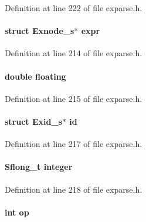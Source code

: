 Definition at line 222 of file exparse.\+h.

\hypertarget{union_e_x_s_t_y_p_e_a5147a7084c9f4929f621b9c1d88f37e4}{
\paragraph[{expr}]{\setlength{\rightskip}{0pt plus 5cm}struct Exnode\+\_\+s$\ast$ expr}}\label{union_e_x_s_t_y_p_e_a5147a7084c9f4929f621b9c1d88f37e4}


Definition at line 214 of file exparse.\+h.

\hypertarget{union_e_x_s_t_y_p_e_a347120387fb1d297ddcdf38a1fe7578f}{
\paragraph[{floating}]{\setlength{\rightskip}{0pt plus 5cm}double floating}}\label{union_e_x_s_t_y_p_e_a347120387fb1d297ddcdf38a1fe7578f}


Definition at line 215 of file exparse.\+h.

\hypertarget{union_e_x_s_t_y_p_e_a8cbcc48b98839e0560a1b4ea77ad9fce}{
\paragraph[{id}]{\setlength{\rightskip}{0pt plus 5cm}struct Exid\+\_\+s$\ast$ id}}\label{union_e_x_s_t_y_p_e_a8cbcc48b98839e0560a1b4ea77ad9fce}


Definition at line 217 of file exparse.\+h.

\hypertarget{union_e_x_s_t_y_p_e_a18927fffeef0d58b4627da1446d7b0b8}{
\paragraph[{integer}]{\setlength{\rightskip}{0pt plus 5cm}Sflong\+\_\+t integer}}\label{union_e_x_s_t_y_p_e_a18927fffeef0d58b4627da1446d7b0b8}


Definition at line 218 of file exparse.\+h.

\hypertarget{union_e_x_s_t_y_p_e_a8b21910e53867f3b53d61a8c46ac2a7f}{
\paragraph[{op}]{\setlength{\rightskip}{0pt plus 5cm}int op}}\label{union_e_x_s_t_y_p_e_a8b21910e53867f3b53d61a8c46ac2a7f}


